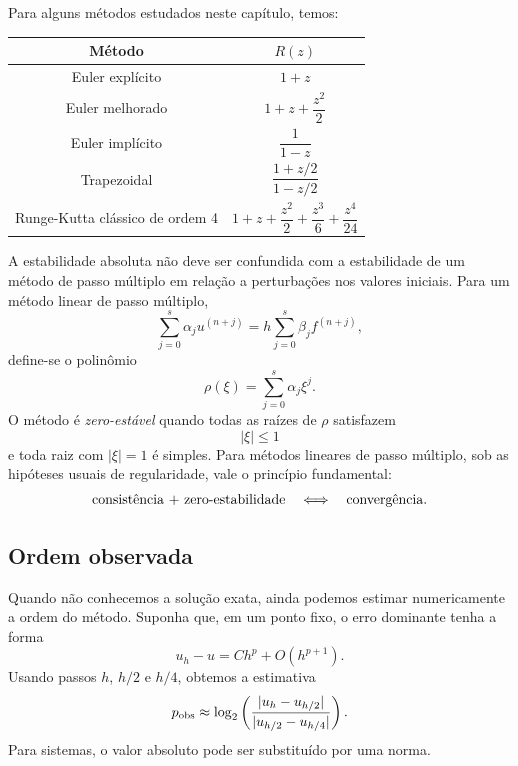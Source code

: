 Para alguns métodos estudados neste capítulo, temos:
\begin{center}
\begin{tabular}{|c|c|}
\hline
Método & $R(z)$\\
\hline
Euler explícito & $1+z$\\
\hline
Euler melhorado & $1+z+\dfrac{z^2}{2}$\\
\hline
Euler implícito & $\dfrac{1}{1-z}$\\
\hline
Trapezoidal & $\dfrac{1+z/2}{1-z/2}$\\
\hline
Runge-Kutta clássico de ordem 4 &
$1+z+\dfrac{z^2}{2}+\dfrac{z^3}{6}+\dfrac{z^4}{24}$\\
\hline
\end{tabular}
\end{center}

A estabilidade absoluta não deve ser confundida com a estabilidade de um método de passo múltiplo em relação a perturbações nos valores iniciais. Para um método linear de passo múltiplo,
\begin{equation}
\sum_{j=0}^s\alpha_j u^{(n+j)}
=
h\sum_{j=0}^s\beta_j f^{(n+j)},
\end{equation}
define-se o polinômio
\begin{equation}
\rho(\xi)=\sum_{j=0}^s\alpha_j\xi^j.
\end{equation}
O método é \emph{zero-estável} quando todas as raízes de $\rho$ satisfazem
\begin{equation}
|\xi|\leq1
\end{equation}
e toda raiz com $|\xi|=1$ é simples. Para métodos lineares de passo múltiplo, sob as hipóteses usuais de regularidade, vale o princípio fundamental:
\begin{equation}
\hbox{consistência + zero-estabilidade}
\quad\Longleftrightarrow\quad
\hbox{convergência}.
\end{equation}

\subsection*{Ordem observada}

Quando não conhecemos a solução exata, ainda podemos estimar numericamente a ordem do método. Suponha que, em um ponto fixo, o erro dominante tenha a forma
\begin{equation}
u_h-u=C h^p+O(h^{p+1}).
\end{equation}
Usando passos $h$, $h/2$ e $h/4$, obtemos a estimativa
\begin{equation}
p_{\rm obs}\approx
\log_2\left(
\frac{|u_h-u_{h/2}|}{|u_{h/2}-u_{h/4}|}
\right).
\end{equation}
Para sistemas, o valor absoluto pode ser substituído por uma norma.

